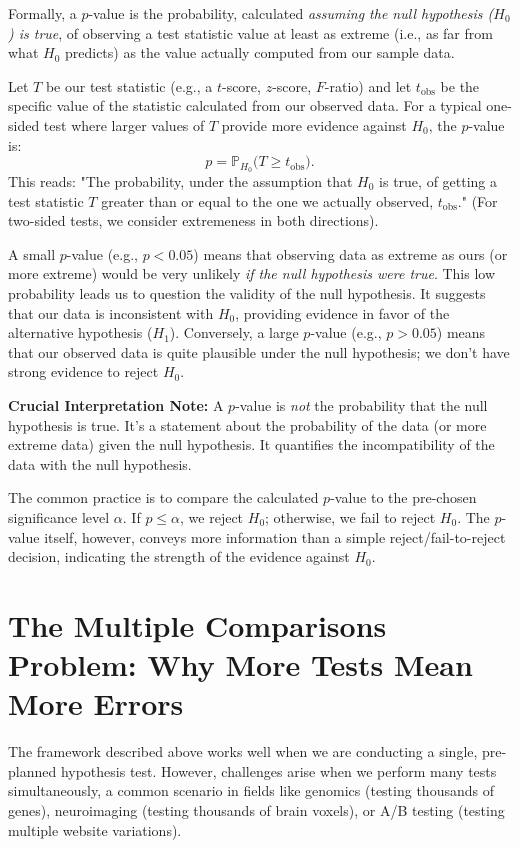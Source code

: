 \documentclass[12pt]{book}
\newcommand{\Prob}{\mathbb{P}}           %
\newcommand{\pvalue}{$p$-value}          %
\newcommand{\Hnull}{H_0}                 %
\newcommand{\Halt}{H_1}                  %
\begin{document}
Formally, a \pvalue{} is the probability, calculated \emph{assuming the null hypothesis ($\Hnull$) is true}, of observing a test statistic value at least as extreme (i.e., as far from what $\Hnull$ predicts) as the value actually computed from our sample data.

Let $T$ be our test statistic (e.g., a $t$-score, $z$-score, $F$-ratio) and let $t_{\text{obs}}$ be the specific value of the statistic calculated from our observed data. For a typical one-sided test where larger values of $T$ provide more evidence against $\Hnull$, the \pvalue{} is:
\begin{equation}
  p = \Prob_{\Hnull}\bigl( T \ge t_{\text{obs}} \bigr).
  \label{eq:pvalue_def}
\end{equation}
This reads: "The probability, under the assumption that $\Hnull$ is true, of getting a test statistic $T$ greater than or equal to the one we actually observed, $t_{\text{obs}}$." (For two-sided tests, we consider extremeness in both directions).

A small \pvalue{} (e.g., $p < 0.05$) means that observing data as extreme as ours (or more extreme) would be very unlikely \emph{if the null hypothesis were true}. This low probability leads us to question the validity of the null hypothesis. It suggests that our data is inconsistent with $\Hnull$, providing evidence in favor of the alternative hypothesis ($\Halt$). Conversely, a large \pvalue{} (e.g., $p > 0.05$) means that our observed data is quite plausible under the null hypothesis; we don't have strong evidence to reject $\Hnull$.

\textbf{Crucial Interpretation Note:} A \pvalue{} is \emph{not} the probability that the null hypothesis is true. It's a statement about the probability of the data (or more extreme data) given the null hypothesis. It quantifies the incompatibility of the data with the null hypothesis.

The common practice is to compare the calculated \pvalue{} to the pre-chosen significance level $\alpha$. If $p \le \alpha$, we reject $\Hnull$; otherwise, we fail to reject $\Hnull$. The \pvalue{} itself, however, conveys more information than a simple reject/fail-to-reject decision, indicating the strength of the evidence against $\Hnull$.

\section{The Multiple Comparisons Problem: Why More Tests Mean More Errors}
The framework described above works well when we are conducting a single, pre-planned hypothesis test. However, challenges arise when we perform many tests simultaneously, a common scenario in fields like genomics (testing thousands of genes), neuroimaging (testing thousands of brain voxels), or A/B testing (testing multiple website variations).
\end{document}
